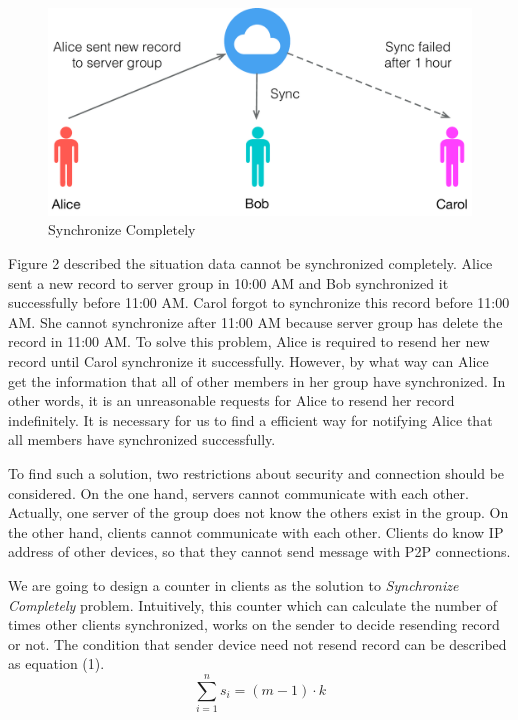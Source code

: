 \documentclass[twocolumn,10pt]{article}
\begin{document}
\begin{figure}[t]
\centering
\includegraphics[scale=0.4]{sync_completely}
\caption{Synchronize Completely}
\end{figure}

Figure 2 described the situation data cannot be synchronized completely. Alice sent a new record to server group in 10:00 AM and Bob synchronized it successfully before 11:00 AM. Carol forgot to synchronize this record before 11:00 AM. She cannot synchronize after 11:00 AM because server group has delete the record in 11:00 AM. To solve this problem, Alice is required to resend her new record until Carol synchronize it successfully. However, by what way can Alice get the information that all of other members in her group have synchronized. In other words, it is an unreasonable requests for Alice to resend her record indefinitely. It is necessary for us to find a efficient way for notifying Alice that all members have synchronized successfully.

To find such a solution, two restrictions about security and connection should be considered. On the one hand, servers cannot communicate with each other. Actually, one server of the group does not know the others exist in the group. On the other hand, clients cannot communicate with each other. Clients do know IP address of other devices, so that they cannot send message with P2P connections.

We are going to design a counter in clients as the solution to \emph{Synchronize Completely} problem. Intuitively, this counter which can calculate the number of times other clients synchronized, works on the sender to decide resending record or not. The condition that sender device need not resend record can be described as equation (1).
\begin{equation}
\sum_{i=1}^{n}s_{i}=(m-1)\cdot k
\end{equation}
\end{document}
